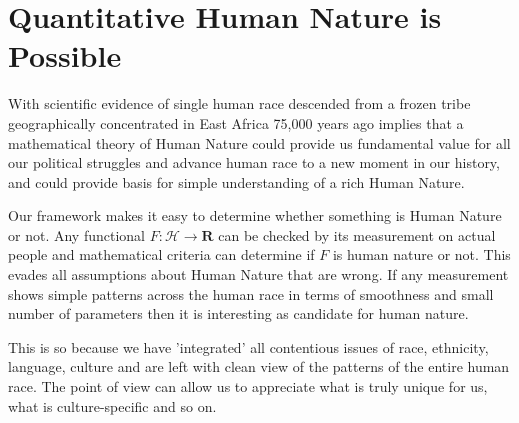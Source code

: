 \documentclass{amsart}
\begin{document}
\section{Quantitative Human Nature is Possible}

With scientific evidence of single human race descended from a frozen tribe geographically concentrated in East Africa 75,000 years ago implies that a mathematical theory of Human Nature could provide us fundamental value for all our political struggles and advance human race to a new moment in our history, and could provide basis for simple understanding of a rich Human Nature.

Our framework makes it easy to determine whether something is Human Nature or not.  Any functional $F:\mathcal{H}\rightarrow\mathbf{R}$ can be checked by its measurement on actual people and mathematical criteria can determine if $F$ is human nature or not.  This evades all assumptions about Human Nature that are wrong.  If any measurement shows simple patterns across the human race in terms of smoothness and small number of parameters then it is interesting as candidate for human nature. 

This is so because we have 'integrated' all contentious issues of race, ethnicity, language, culture and are left with clean view of the patterns of the entire human race.  The point of view can allow us to appreciate what is truly unique for us, what is culture-specific and so on.
\end{document}
